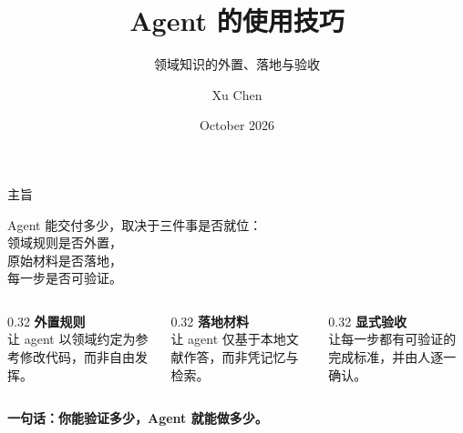 \documentclass[aspectratio=169]{beamer}
\title[Agent 的使用技巧]{Agent 的使用技巧}
\subtitle{领域知识的外置、落地与验收}
\author[Xu Chen]{Xu Chen}
\date{October 2026}
\begin{document}
\begin{frame}
  \titlepage
\end{frame}

\begin{frame}{主旨}
  \begin{center}
  {\Large Agent 能交付多少，取决于三件事是否就位：}\\[4pt]
  {\Large 领域规则是否\alert{外置}，}\\
  {\Large 原始材料是否\alert{落地}，}\\
  {\Large 每一步是否可\alert{验证}。}
  \end{center}
  \bigskip
  \begin{columns}[T]
    \begin{column}{0.32\textwidth}
      \textcolor{sig}{\textbf{外置规则}}\\[2pt]
      \small 让 agent 以领域约定为参考修改代码，而非自由发挥。
    \end{column}
    \begin{column}{0.32\textwidth}
      \textcolor{accent}{\textbf{落地材料}}\\[2pt]
      \small 让 agent 仅基于本地文献作答，而非凭记忆与检索。
    \end{column}
    \begin{column}{0.32\textwidth}
      \textcolor{video}{\textbf{显式验收}}\\[2pt]
      \small 让每一步都有可验证的完成标准，并由人逐一确认。
    \end{column}
  \end{columns}
  \bigskip
  \begin{center}
  \textbf{一句话：你能验证多少，Agent 就能做多少。}
  \end{center}
\end{frame}
\end{document}
